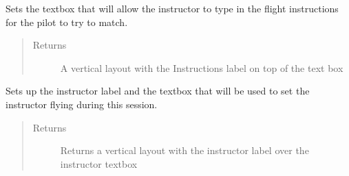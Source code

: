 \documentclass[letterpaper,10pt,english]{sphinxmanual}
\begin{document}
\begin{fulllineitems}
\begin{fulllineitems}
\begin{quote}
\begin{description}
\end{description}\end{quote}

\end{fulllineitems}


\begin{fulllineitems}
\label{\detokenize{index:src.Views.View_TrackingScreen.TrackingWindow.setFlightInstructions}}
Sets the textbox that will allow the instructor to type in the flight instructions for the pilot
to try to match.
\begin{quote}\begin{description}
\item[{Returns}] \leavevmode
A vertical layout with the Instructions label on top of the text box

\end{description}\end{quote}

\end{fulllineitems}


\begin{fulllineitems}
\label{\detokenize{index:src.Views.View_TrackingScreen.TrackingWindow.setInstructor}}
Sets up the instructor label and the textbox that will be used to set the instructor flying during this
session.
\begin{quote}\begin{description}
\item[{Returns}] \leavevmode
Returns a vertical layout with the instructor label over the instructor textbox

\end{description}\end{quote}

\end{fulllineitems}



\end{fulllineitems}
\end{document}
